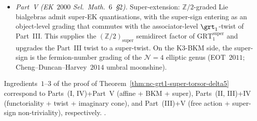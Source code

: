 \begin{remark}
\begin{itemize}
 hyperbolic extension; the imaginary-cone multiplicities
 $\mathrm{mult}(\alpha) = c_{K3}(4nm - \ell^2)$ (EOT~$2011$) replace
 the zero multiplicities of the affine case.
\item \emph{Part~V (EK~$2000$ Sel.~Math.~$6$~\S$2$).} Super-extension:
 $\mathbb Z/2$-graded Lie bialgebras admit super-EK quantisations,
 with the super-sign entering as an object-level grading that
 commutes with the associator-level $\grt_1$-twist of Part~III.
 This supplies the $(\mathbb Z/2)_{\mathrm{super}}$ semidirect factor
 of $\mathrm{GRT}_1^{\mathrm{super}}$ and upgrades the Part~III twist
 to a super-twist. On the K$3$-BKM side, the super-sign is the
 fermion-number grading of the $\mathcal N = 4$ elliptic genus
 (EOT~$2011$; Cheng--Duncan--Harvey~$2014$ umbral moonshine).
\end{itemize}
Ingredients~$1$--$3$ of the proof of
Theorem~\ref{thm:nc-grt1-super-torsor-delta5} correspond to
Parts~(I, IV)+Part~V (affine + BKM + super), Parts~(II, III)+IV
(functoriality + twist + imaginary cone), and Part~(III)+V
(free action + super-sign non-triviality), respectively.
\cite{EtingofKazhdan1996,EtingofKazhdan1998a,EtingofKazhdan1998b,
 EtingofKazhdan2000,EtingofKazhdan2008}.
\end{remark}

